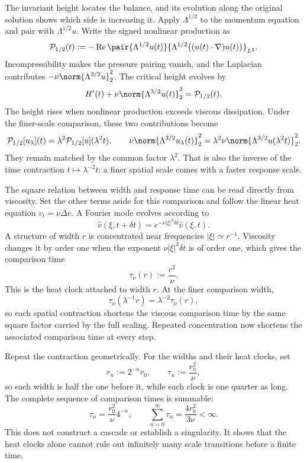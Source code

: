 
The invariant height locates the balance, and its evolution along the original solution shows which side is increasing it.
Apply \(\Lambda^{1/2}\) to the momentum equation and pair with \(\Lambda^{1/2}u\).
Write the signed nonlinear production as
\[
  \mathcal P_{1/2}(t)
  :=
  -\operatorname{Re}
  \pair
    {\Lambda^{1/2}u(t)}
    {\Lambda^{1/2}\bigl((u(t)\cdot\nabla)u(t)\bigr)}_{L^2}.
\]
Incompressibility makes the pressure pairing vanish, and the Laplacian contributes \(-\nu\norm{\Lambda^{3/2}u}_2^2\).
The critical height evolves by
\[
  H'(t)
  +
  \nu\norm{\Lambda^{3/2}u(t)}_2^2
  =
  \mathcal P_{1/2}(t).
\]
The height rises when nonlinear production exceeds viscous dissipation.
Under the finer-scale comparison, these two contributions become
\[
  \mathcal P_{1/2}[u_\lambda](t)
  =
  \lambda^2\mathcal P_{1/2}[u](\lambda^2t),
  \qquad
  \nu\norm{\Lambda^{3/2}u_\lambda(t)}_2^2
  =
  \lambda^2\nu\norm{\Lambda^{3/2}u(\lambda^2t)}_2^2.
\]
They remain matched by the common factor \(\lambda^2\).
That is also the inverse of the time contraction \(t\mapsto\lambda^{-2}t\): a finer spatial scale comes with a faster response scale.


The square relation between width and response time can be read directly from viscosity.
Set the other terms aside for this comparison and follow the linear heat equation \(v_t=\nu\Delta v\).
A Fourier mode evolves according to
\[
  \widehat v(\xi,t+\delta t)
  =
  e^{-\nu|\xi|^2\delta t}\widehat v(\xi,t).
\]
A structure of width \(r\) is concentrated near frequencies \(|\xi|\simeq r^{-1}\).
Viscosity changes it by order one when the exponent \(\nu|\xi|^2\delta t\) is of order one, which gives the comparison time
\[
  \tau_\nu(r)
  :=
  \frac{r^2}{\nu}.
\]
This is the heat clock attached to width \(r\).
At the finer comparison width,
\[
  \tau_\nu(\lambda^{-1}r)
  =
  \lambda^{-2}\tau_\nu(r),
\]
so each spatial contraction shortens the viscous comparison time by the same square factor carried by the full \NavierStokes{} scaling.
Repeated concentration now shortens the associated comparison time at every step.


Repeat the contraction geometrically.
For the widths and their heat clocks, set
\[
  r_n:=2^{-n}r_0,
  \qquad
  \tau_n:=\frac{r_n^2}{\nu},
\]
so each width is half the one before it, while each clock is one quarter as long.
The complete sequence of comparison times is summable:
\[
  \tau_n
  =
  \frac{r_0^2}{\nu}4^{-n},
  \qquad
  \sum_{n=0}^{\infty}\tau_n
  =
  \frac{4r_0^2}{3\nu}
  <
  \infty.
\]
This does not construct a cascade or establish a singularity.
It shows that the heat clocks alone cannot rule out infinitely many scale transitions before a finite time.

